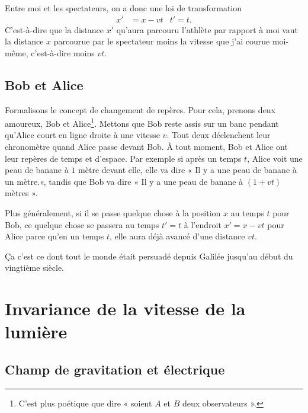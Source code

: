 Entre moi et les spectateurs, on a donc une loi de transformation
\begin{align}		\label{EqTransGal}
	x' & =x-vt & t'=t.
\end{align}
C'est-à-dire que la distance \( x'\) qu'aura parcouru l'athlète par rapport à moi vaut la distance \( x\) parcourue par le spectateur moins la vitesse que j'ai courue moi-même, c'est-à-dire moins \( vt\).

\subsection{Bob et Alice}

Formalisons le concept de changement de repères. Pour cela, prenons deux amoureux, Bob et Alice\footnote{C'est plus poétique que dire « soient \( A\) et \( B\) deux observateurs ».}. Mettons que Bob reste assis sur un banc pendant qu'Alice court en ligne droite à une vitesse \( v\). Tout deux déclenchent leur chronomètre quand Alice passe devant Bob. À tout moment, Bob et Alice ont leur repères de temps et d'espace. Par exemple si après un temps \( t\), Alice voit une peau de banane à \( 1\) mètre devant elle, elle va dire « Il y a une peau de banane à un mètre.», tandis que Bob va dire « Il y a une peau de banane à \( (1+vt)\) mètres ».

Plus généralement, si il se passe quelque chose à la position \( x\) au temps \( t\) pour Bob, ce quelque chose se passera au temps \( t'=t\) à l'endroit \( x'=x-vt\) pour Alice parce qu'en un temps \( t\), elle aura déjà avancé d'une distance \( vt\).

Ça c'est ce dont tout le monde était persuadé depuis Galilée jusqu'au début du vingtième siècle.

%
\section{Invariance de la vitesse de la lumière}
%

\subsection{Champ de gravitation et électrique}

